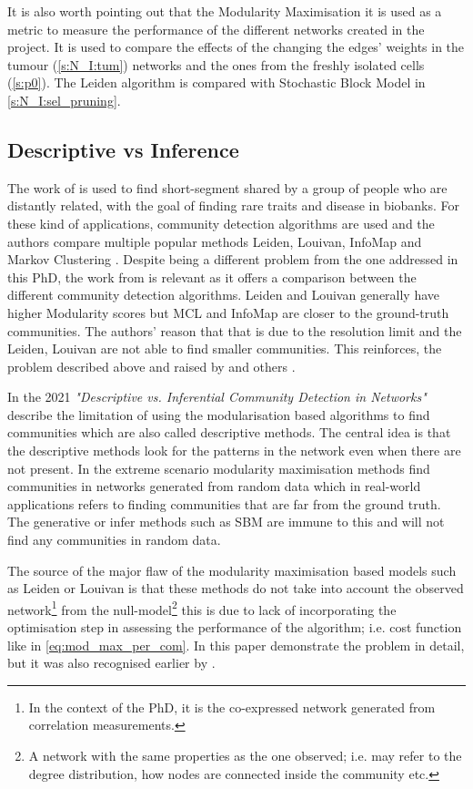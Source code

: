 It is also worth pointing out that the Modularity Maximisation it is used as a metric to measure the performance of the different networks created in the project. It is used to compare the effects of the changing the edges' weights in the tumour (\cref{s:N_I:tum}) networks and the ones from the freshly isolated cells (\cref{s:p0}). The Leiden algorithm is compared with Stochastic Block Model in \cref{s:N_I:sel_pruning}.


\subsection{Descriptive vs Inference} \label{s:lit:descriptive_inference}

The work of \citet{Shemirani2023-ww} is used to find short-segment shared by a group of people who are distantly related, with the goal of finding rare traits and disease in biobanks. For these kind of applications, community detection algorithms are used and the authors compare multiple popular methods Leiden, Louivan, InfoMap \citep{Rosvall2008-kw} and Markov Clustering \citep{Van_Dongen2008-yj}. Despite being a different problem from the one addressed in this PhD, the work from \citet{Shemirani2023-ww} is relevant as it offers a comparison between the different community detection algorithms. Leiden and Louivan generally have higher Modularity scores but MCL and InfoMap are closer to the ground-truth communities. The authors' reason that that is due to the resolution limit and the Leiden, Louivan are not able to find smaller communities. This reinforces, the problem described above and raised by \citep{Peixoto2021-jx} and others \citep{Fortunato2007-gh, Traag2019-ne}.

In the 2021 \textit{"Descriptive vs. Inferential Community Detection in Networks"} \citep{Peixoto2021-jx} describe the limitation of using the modularisation based algorithms to find communities which are also called descriptive methods. The central idea is that the descriptive methods look for the patterns in the network even when there are not present. In the extreme scenario modularity maximisation methods find communities in networks generated from random data which in real-world applications refers to finding communities that are far from the ground truth. The generative or infer methods such as SBM are immune to this and will not find any communities in random data.

The source of the major flaw of the modularity maximisation based models such as Leiden or Louivan is that these methods do not take into account the observed network\footnote{In the context of the PhD, it is the co-expressed network generated from correlation measurements.} from the null-model\footnote{A network with the same properties as the one observed; i.e. may refer to the degree distribution, how nodes are connected inside the community etc.} this is due to lack of incorporating the optimisation step in assessing the performance of the algorithm; i.e. cost function like in \cref{eq:mod_max_per_com}. In this paper \citet{Peixoto2021-jx} demonstrate the problem in detail, but it was also recognised earlier by \citet{Guimera2004-gv}.

